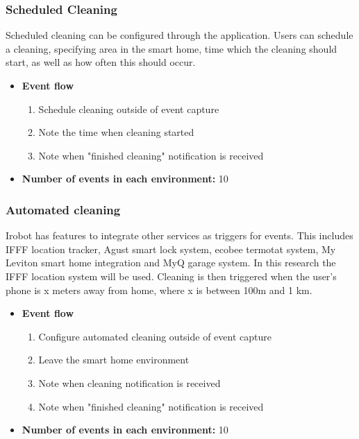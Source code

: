 \subsubsection{Scheduled Cleaning}
Scheduled cleaning can be configured through the application. Users can schedule a cleaning, specifying area in the smart home, time which the cleaning should start, as well as how often this should occur. 
\begin{itemize}
    \item \textbf{Event flow} \begin{enumerate}
                                    \item Schedule cleaning outside of event capture
                                    \item Note the time when cleaning started
                                    \item Note when "finished cleaning" notification is received
                                \end{enumerate}
    \item \textbf{Number of events in each environment:} 10
\end{itemize}

\subsubsection{Automated cleaning}
Irobot has features to integrate other services as triggers for events. This includes IFFF location tracker, Agust smart lock system, ecobee termotat system, My Leviton smart home integration and MyQ garage system. In this research the IFFF location system will be used. Cleaning is then triggered when the user's phone is x meters away from home, where x is between 100m and 1 km. 

\begin{itemize}
    \item \textbf{Event flow} \begin{enumerate}
                                    \item Configure automated cleaning outside of event capture
                                    \item Leave the smart home environment
                                    \item Note when cleaning notification is received
                                    \item Note when "finished cleaning" notification is received
                                \end{enumerate}
    \item \textbf{Number of events in each environment:} 10
\end{itemize}

